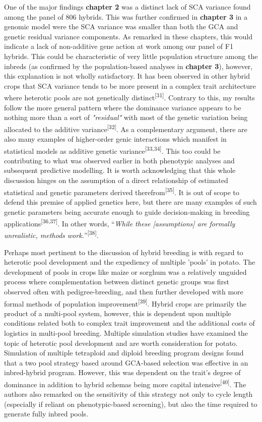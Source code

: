 One of the major findings \textbf{chapter 2} was a distinct lack of SCA
variance found among the panel of 806 hybrids. This was further
confirmed in \textbf{chapter 3} in a genomic model were the SCA variance
was smaller than both the GCA and genetic residual variance components.
As remarked in these chapters, this would indicate a lack of
non-additive gene action at work among our panel of F1 hybrids. This
could be characteristic of very little population structure among the
inbreds (as confirmed by the population-based analyses in
\textbf{chapter 3}), however, this explanation is not wholly
satisfactory. It has been observed in other hybrid crops that SCA
variance tends to be more present in a complex trait architecture where
heterotic pools are not genetically distinct\textsuperscript{{[}31{]}}.
Contrary to this, my results follow the more general pattern where the dominance variance appears to be nothing
more than a sort of \emph{"residual"} with most of the genetic variation
being allocated to the additive variance\textsuperscript{{[}32{]}}. As a
complementary argument, there are also many examples of higher-order
genic interactions which manifest in statistical models as additive
genetic variance\textsuperscript{{[}33,34{]}}. This too could be
contributing to what was observed earlier in both phenotypic analyses
and subsequent predictive modelling. It is worth acknowledging that this
whole discussion hinges on the assumption of a direct relationship of
estimated statistical and genetic parameters derived
therefrom\textsuperscript{{[}35{]}}. It is out of scope to defend this
premise of applied genetics here, but there are many examples of such
genetic parameters being accurate enough to guide decision-making in
breeding applications\textsuperscript{{[}36,37{]}}. In other words,
``\emph{While these {[}assumptions{]} are formally unrealistic, methods
work.}''\textsuperscript{{[}38{]}}.

Perhaps most pertinent to the discussion of hybrid breeding is with
regard to heterotic pool development and the expediency of multiple 'pools' in potato.
The development of pools in crops like maize or sorghum was a relatively
unguided process where complementation between distinct genetic groups
was first observed often with pedigree-breeding, and then further
developed with more formal methods of population
improvement\textsuperscript{{[}39{]}}. Hybrid crops are primarily the
product of a multi-pool system, however, this is dependent upon multiple
conditions related both to complex trait improvement and the additional
costs of logistics in multi-pool breeding. Multiple simulation studies
have examined the topic of heterotic pool development and are worth
consideration for potato. Simulation of multiple tetraploid and diploid
breeding program designs found that a two pool strategy based around
GCA-based selection was effective in an inbred-hybrid program. However,
this was dependent on the trait's degree of dominance in addition to
hybrid schemas being more capital intensive\textsuperscript{{[}40{]}}.
The authors also remarked on the sensitivity of this strategy not only
to cycle length (especially if reliant on phenotypic-based screening),
but also the time required to generate fully inbred pools.

